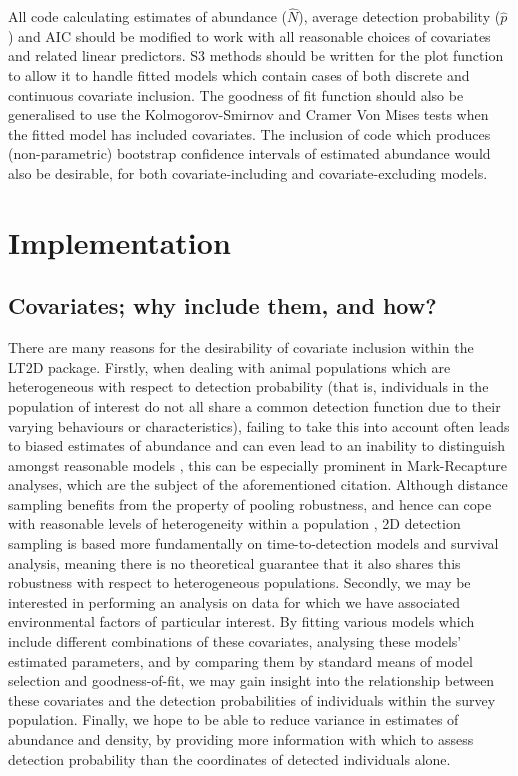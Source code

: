 \documentclass[11pt]{article}
\begin{document}
\begin{multicols}{2}
All code calculating estimates of abundance ($\hat{N}$), average detection probability ($\hat{p}$) and AIC should be modified to work with all reasonable choices of covariates and related linear predictors. S3 methods should be written for the plot function to allow it to handle fitted models which contain cases of both discrete and continuous covariate inclusion. The goodness of fit function should also be generalised to use the Kolmogorov-Smirnov and Cramer Von Mises tests when the fitted model has included covariates. The inclusion of code which produces (non-parametric) bootstrap confidence intervals of estimated abundance would also be desirable, for both covariate-including and covariate-excluding models.

\section{Implementation}
\subsection{Covariates; why include them, and how?}
There are many reasons for the desirability of covariate inclusion within the LT2D package. Firstly, when dealing with animal populations which are heterogeneous with respect to detection probability (that is, individuals in the population of interest do not all share a common detection function due to their varying behaviours or characteristics), failing to take this into account often leads to biased estimates of abundance and can even lead to an inability to distinguish amongst reasonable models \cite{Link}, this can be especially prominent in Mark-Recapture analyses, which are the subject of the aforementioned citation. Although distance sampling benefits from the property of pooling robustness, and hence can cope with reasonable levels of heterogeneity within a population \cite{Buckland2004}, 2D detection sampling is based more fundamentally on time-to-detection models and survival analysis, meaning there is no theoretical guarantee that it also shares this robustness with respect to heterogeneous populations. Secondly, we may be interested in performing an analysis on data for which we have associated environmental factors of particular interest. By fitting various models which include different combinations of these covariates, analysing these models' estimated parameters, and by comparing them by standard means of model selection and goodness-of-fit, we may gain insight into the relationship between these covariates and the detection probabilities of individuals within the survey population. Finally, we hope to be able to reduce variance in estimates of abundance and density, by providing more information with which to assess detection probability than the coordinates of detected individuals alone.


\end{multicols}
\end{document}
